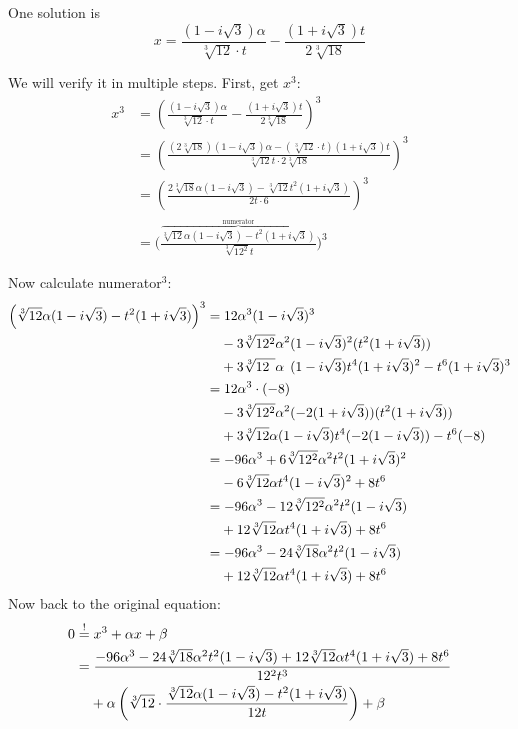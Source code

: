 One solution is
\[x = \frac{(1-i \sqrt{3}) \alpha}{\sqrt[3]{12} \cdot t}
     -\frac{(1+i\sqrt{3}) t}{2\sqrt[3]{18}}\]

We will verify it in multiple steps. First, get $x^3$:
\begin{align}
    x^3 &= \left (\frac{(1-i \sqrt{3}) \alpha}{\sqrt[3]{12} \cdot t} - \frac{(1+i\sqrt{3}) t}{2\sqrt[3]{18}} \right)^3\\
    &= \left (\frac{(2\sqrt[3]{18})(1-i \sqrt{3}) \alpha - (\sqrt[3]{12} \cdot t)(1+i\sqrt{3}) t}{\sqrt[3]{12} t \cdot 2 \sqrt[3]{18}} \right)^3\\
    &= \left (\frac{2\sqrt[3]{18}\alpha (1-i \sqrt{3}) - \sqrt[3]{12} t^2(1+i\sqrt{3})}{2t \cdot 6} \right )^3\\
    &= \bigg (\frac{\overbrace{\sqrt[3]{12} \alpha (1-i \sqrt{3}) - t^2 (1+i\sqrt{3})}^{\text{numerator}}}{\sqrt[3]{12^2} t} \bigg )^3
\end{align}

Now calculate numerator$^3$:
\begin{align}
    \left (\sqrt[3]{12} \alpha (1-i \sqrt{3}) - t^2(1+i\sqrt{3}) \right )^3 &= 
    12 \alpha^3 (1-i\sqrt{3})^3 \\
    &\hphantom{{}=}- 3 \sqrt[3]{12^2} \alpha^2(1-i\sqrt{3})^2 (t^2(1+i \sqrt{3}))\\
    &\hphantom{{}=}+ 3 \sqrt[3]{12\hphantom{^2}} \alpha\hphantom{^2} (1-i\sqrt{3}) t^4 (1+i\sqrt{3})^2 - t^6 (1+i\sqrt{3})^3\\
    &= 12 \alpha^3 \cdot (-8) \\
    &\hphantom{{}=}- 3 \sqrt[3]{12^2} \alpha^2(-2(1+i\sqrt{3}))(t^2(1+i \sqrt{3}))\\
    &\hphantom{{}=}+ 3 \sqrt[3]{12} \alpha (1-i\sqrt{3}) t^4 (-2(1-i\sqrt{3})) - t^6 (-8)\\
    &= -96 \alpha^3 + 6 \sqrt[3]{12^2} \alpha^2 t^2 (1+i \sqrt{3})^2\\
    &\hphantom{{}=}- 6 \sqrt[3]{12} \alpha t^4 (1-i\sqrt{3})^2 +8 t^6\\
    &= -96 \alpha^3 - 12 \sqrt[3]{12^2} \alpha^2 t^2 (1-i \sqrt{3})\\
    &\hphantom{{}=}+ 12 \sqrt[3]{12} \alpha t^4 (1+i \sqrt{3}) +8 t^6\\
    &= -96 \alpha^3 - 24 \sqrt[3]{18} \alpha^2 t^2 (1-i \sqrt{3})\\
    &\hphantom{{}=}+ 12 \sqrt[3]{12} \alpha t^4 (1+i \sqrt{3}) +8 t^6
\end{align}
\goodbreak
Now back to the original equation:
\begin{align}
0 &\stackrel{!}{=} x^3 + \alpha x + \beta\\
  &= \frac{-96 \alpha^3 - 24 \sqrt[3]{18} \alpha^2 t^2 (1-i \sqrt{3}) + 12 \sqrt[3]{12} \alpha t^4 (1+i \sqrt{3}) +8 t^6}{12^2 t^3}\\
  &\hphantom{{}=}+\alpha \left (\sqrt[3]{12} \cdot \frac{\sqrt[3]{12} \alpha (1-i \sqrt{3}) - t^2(1+i\sqrt{3})}{12t} \right ) + \beta
\end{align}

